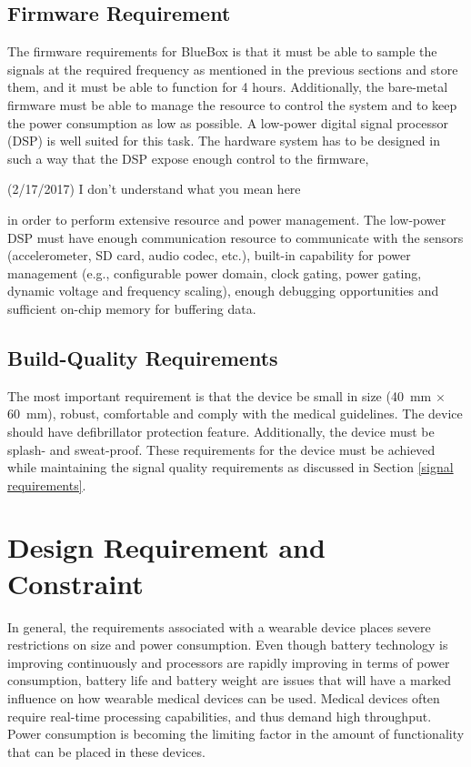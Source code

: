 \subsection{Firmware Requirement }

The firmware requirements for BlueBox is that it must be able to
sample the signals at the required frequency as mentioned in the
previous sections and store them, and it must be able to function for
4 hours. Additionally, the bare-metal firmware must be able to manage
the resource to control the system and to keep the power consumption
as low as possible. A low-power digital signal processor (DSP) is
well suited for this task. The hardware system has to be designed in
such a way that the DSP expose enough control to the firmware,
\begin{cmtPai}
	(2/17/2017) I don't understand what you mean here
\end{cmtPai}
in order to perform extensive resource and power management. The
low-power DSP must have enough communication resource to communicate
with the sensors (accelerometer, SD card, audio codec, etc.),
built-in capability for power management (e.g., configurable power
domain, clock gating, power gating, dynamic voltage and frequency
scaling), enough debugging opportunities and sufficient on-chip
memory for buffering data. 

\subsection {Build-Quality Requirements} 

The most important requirement is that the device be small in size
(40~mm $\times$ 60~mm), robust, comfortable and comply with the
medical guidelines. The device should have defibrillator protection
feature.  Additionally, the device must be splash- and sweat-proof.
These requirements for the device must be achieved while maintaining
the signal quality requirements as discussed in Section \ref{signal
requirements}.  

\section {Design Requirement and Constraint} 

In general, the requirements associated with a wearable device
places severe restrictions on size and power consumption. Even though
battery technology is improving continuously and processors are
rapidly improving in terms of power consumption, battery life and
battery weight are issues that will have a marked influence on how
wearable medical devices can be used. Medical devices often require
real-time processing capabilities, and thus demand high throughput.
Power consumption is becoming the limiting factor in the amount of
functionality that can be placed in these devices. 

